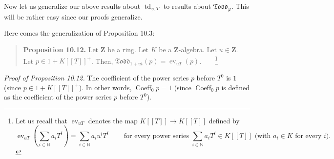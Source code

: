 \documentclass[numbers=enddot,12pt,final,onecolumn,notitlepage]{scrartcl}%
\begin{document}
Now let us generalize our above results about $\operatorname*{td}%
\nolimits_{\varphi,T}$ to results about $\mathfrak{Todd}_{\varphi}$. This will
be rather easy since our proofs generalize.

Here comes the generalization of Proposition 10.3:

\begin{quote}
\textbf{Proposition 10.12.} Let $\mathbf{Z}$ be a ring. Let $K$ be a
$\mathbf{Z}$-algebra. Let $u\in\mathbf{Z}$. Let $p\in1+K\left[  \left[
T\right]  \right]  ^{+}$. Then, $\mathfrak{Todd}_{1+ut}\left(  p\right)
=\operatorname*{ev}\nolimits_{uT}\left(  p\right)  $.\ \ \ \ \footnote{Let us
recall that $\operatorname*{ev}\nolimits_{uT}$ denotes the map $K\left[
\left[  T\right]  \right]  \rightarrow K\left[  \left[  T\right]  \right]  $
defined by%
\[
\operatorname*{ev}\nolimits_{uT}\left(  \sum\limits_{i\in\mathbb{N}}a_{i}%
T^{i}\right)  =\sum\limits_{i\in\mathbb{N}}a_{i}u^{i}T^{i}%
\ \ \ \ \ \ \ \ \ \ \text{for every power series }\sum\limits_{i\in\mathbb{N}%
}a_{i}T^{i}\in K\left[  \left[  T\right]  \right]  \text{ (with }a_{i}\in
K\text{ for every }i\text{).}%
\]
}
\end{quote}

\textit{Proof of Proposition 10.12.} The coefficient of the power series $p$
before $T^{0}$ is $1$ (since $p\in1+K\left[  \left[  T\right]  \right]  ^{+}%
$). In other words, $\operatorname*{Coeff}\nolimits_{0}p=1$ (since
$\operatorname*{Coeff}\nolimits_{0}p$ is defined as the coefficient of the
power series $p$ before $T^{0}$).
\end{document}
